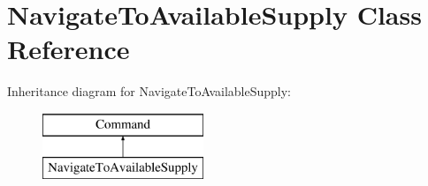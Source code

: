\hypertarget{classNavigateToAvailableSupply}{\section{Navigate\-To\-Available\-Supply Class Reference}
\label{classNavigateToAvailableSupply}
}
Inheritance diagram for Navigate\-To\-Available\-Supply\-:\begin{figure}[H]
\begin{center}
\leavevmode
\includegraphics[height=2.000000cm]{classNavigateToAvailableSupply}
\end{center}
\end{figure}
